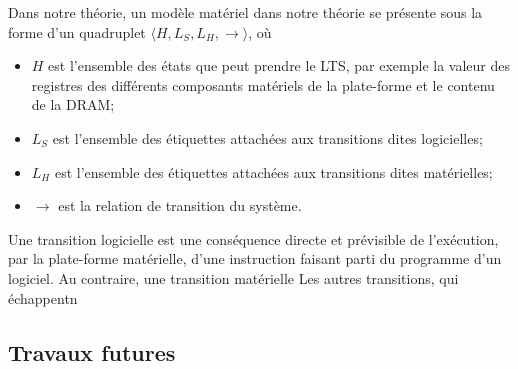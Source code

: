 \begin{otherlanguage}{french}
  Dans notre théorie, un modèle matériel dans notre théorie se présente sous la
  forme d’un quadruplet \( \langle H, L_S, L_H, \rightarrow \rangle \), où
  \begin{itemize}
  \item \( H \) est l’ensemble des états que peut prendre le LTS, par exemple la
    valeur des registres des différents composants matériels de la plate-forme
    et le contenu de la DRAM;
  \item \( L_S \) est l’ensemble des étiquettes attachées aux transitions dites
    logicielles;
  \item \( L_H \) est l’ensemble des étiquettes attachées aux transitions dites
    matérielles;
  \item \( \rightarrow \) est la relation de transition du système.
  \end{itemize}

  Une transition logicielle est une conséquence directe et prévisible de
  l’exécution, par la plate-forme matérielle, d’une instruction faisant parti du
  programme d’un logiciel.
  Au contraire, une transition matérielle Les autres transitions, qui échappentn

  \subsection*{Travaux futures}
\end{otherlanguage}
